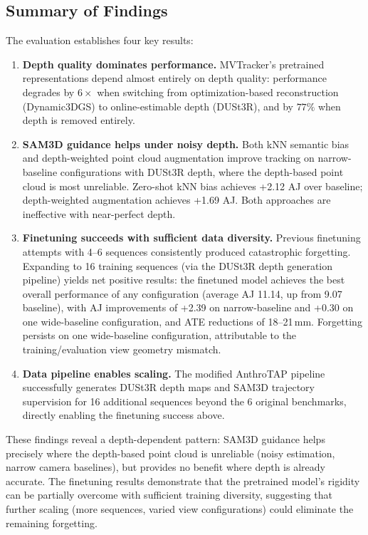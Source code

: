 \documentclass[12pt, a4paper, oneside]{report}
\begin{document}
\subsection{Summary of Findings}
\label{sec:summary_findings}
The evaluation establishes four key results:

\begin{enumerate}
    \item \textbf{Depth quality dominates performance.} MVTracker's pretrained representations depend almost entirely on depth quality: performance degrades by $6\times$ when switching from optimization-based reconstruction (Dynamic3DGS) to online-estimable depth (DUSt3R), and by $77\%$ when depth is removed entirely.

    \item \textbf{SAM3D guidance helps under noisy depth.} Both kNN semantic bias and depth-weighted point cloud augmentation improve tracking on narrow-baseline configurations with DUSt3R depth, where the depth-based point cloud is most unreliable. Zero-shot kNN bias achieves +2.12 AJ over baseline; depth-weighted augmentation achieves +1.69 AJ. Both approaches are ineffective with near-perfect depth.

    \item \textbf{Finetuning succeeds with sufficient data diversity.} Previous finetuning attempts with 4--6 sequences consistently produced catastrophic forgetting. Expanding to 16 training sequences (via the DUSt3R depth generation pipeline) yields net positive results: the finetuned model achieves the best overall performance of any configuration (average AJ 11.14, up from 9.07 baseline), with AJ improvements of +2.39 on narrow-baseline and +0.30 on one wide-baseline configuration, and ATE reductions of 18--21\,mm. Forgetting persists on one wide-baseline configuration, attributable to the training/evaluation view geometry mismatch.

    \item \textbf{Data pipeline enables scaling.} The modified AnthroTAP pipeline successfully generates DUSt3R depth maps and SAM3D trajectory supervision for 16 additional sequences beyond the 6 original benchmarks, directly enabling the finetuning success above.
\end{enumerate}

These findings reveal a depth-dependent pattern: SAM3D guidance helps precisely where the depth-based point cloud is unreliable (noisy estimation, narrow camera baselines), but provides no benefit where depth is already accurate. The finetuning results demonstrate that the pretrained model's rigidity can be partially overcome with sufficient training diversity, suggesting that further scaling (more sequences, varied view configurations) could eliminate the remaining forgetting.
\end{document}
